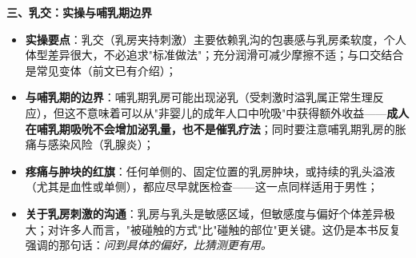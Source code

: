 \textbf{三、乳交：实操与哺乳期边界}
\begin{itemize}
\item \textbf{实操要点}：乳交（乳房夹持刺激）主要依赖乳沟的包裹感与乳房柔软度，个人体型差异很大，不必追求"标准做法"；充分润滑可减少摩擦不适；与口交结合是常见变体（前文已有介绍）；
\item \textbf{与哺乳期的边界}：哺乳期乳房可能出现泌乳（受刺激时溢乳属正常生理反应），但这不意味着可以从"非婴儿的成年人口中吮吸"中获得额外收益——\textbf{成人在哺乳期吸吮不会增加泌乳量，也不是催乳疗法}；同时要注意哺乳期乳房的胀痛与感染风险（乳腺炎）；
\item \textbf{疼痛与肿块的红旗}：任何单侧的、固定位置的乳房肿块，或持续的乳头溢液（尤其是血性或单侧），都应尽早就医检查——这一点同样适用于男性；
\item \textbf{关于乳房刺激的沟通}：乳房与乳头是敏感区域，但敏感度与偏好个体差异极大；对许多人而言，"被碰触的方式"比"碰触的部位"更关键。这仍是本书反复强调的那句话：\emph{问到具体的偏好，比猜测更有用。}
\end{itemize}
